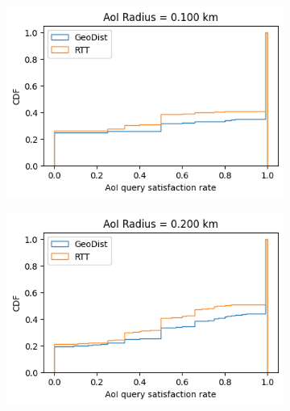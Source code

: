 \begin{figure}
\centering
\begin{subfigure}{0.3\textwidth}
  \centering
  \includegraphics[width=\linewidth]{figures/mechanisms/spatial_ctx_mgmt/aoi_satisfaction_rate_cdf_AOI_0.100_km.png}
  \caption{}
\end{subfigure}%
\begin{subfigure}{0.3\textwidth}
  \centering
  \includegraphics[width=\linewidth]{figures/mechanisms/spatial_ctx_mgmt/aoi_satisfaction_rate_cdf_AOI_0.200_km.png}
  \caption{}
\end{subfigure}
\begin{subfigure}{0.3\textwidth}
  \centering

\end{subfigure}
\end{figure}
